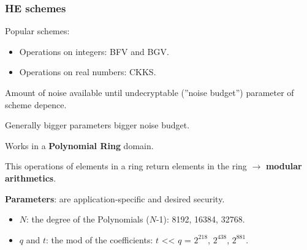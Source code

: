 \documentclass[10pt,handout]{beamer}
\begin{document}
\begin{frame}
    \frametitle{HE schemes}

Popular schemes:
 \vspace{-0.25cm}
\begin{itemize}\itemsep-0.9em
    \item Operations on integers: BFV and BGV.
    \item Operations on real numbers: CKKS.
\end{itemize}

    Amount of noise available until undecryptable (''noise budget'') parameter of scheme depence.

Generally bigger parameters bigger noise budget.

    Works in a \textbf{Polynomial Ring} domain.


\pause
 \vspace{-0.25cm}
    This operations of elements in a ring return elements in the ring $\rightarrow$  \textbf{modular arithmetics}.

 \vspace{-0.25cm}
\textbf{Parameters}: are application-specific and desired security.

\pause
 \vspace{-0.3cm}
\begin{itemize}\itemsep-0.9em
    \item $N$: the degree of the Polynomials ($N$-1):  8192, 16384, 32768.
\pause
    \item $q$ and $t$: the mod of the coefficients: $t$ << $q$ = $2^{218}$,   $2^{438}$,  $2^{881}$.
\end{itemize}
\end{frame}


\end{document}
